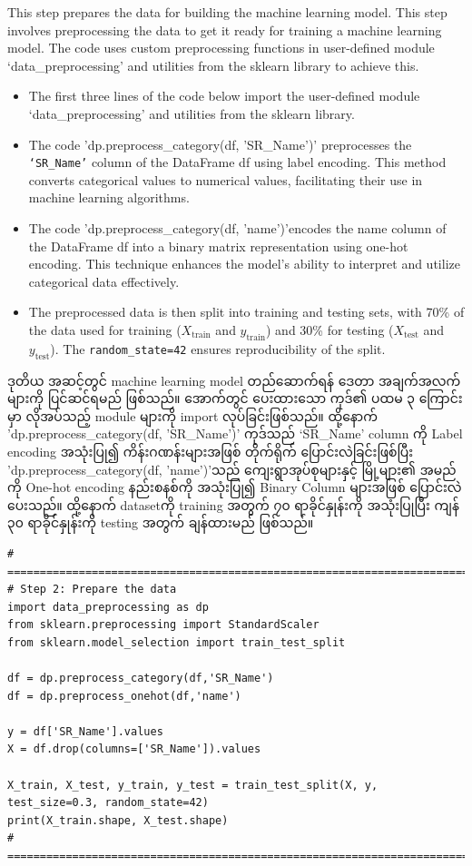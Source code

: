 \begin{step}
This step prepares the data for building the machine learning model. This step involves preprocessing the data to get it ready for training a machine learning model. The code uses custom preprocessing functions in user-defined module `data\_preprocessing' and utilities from the sklearn library to achieve this.
\begin{itemize}
  \item The first three lines of the code below import the user-defined module `data\_preprocessing' and utilities from the sklearn library. 
  
  \item The code 'dp.preprocess\_category(df, 'SR\_Name')' preprocesses the \texttt{`SR\_Name'} column of the DataFrame df using label encoding. This method converts categorical values to numerical values, facilitating their use in machine learning algorithms.
  
  \item The code 'dp.preprocess\_category(df, 'name')'encodes the name column of the DataFrame df into a binary matrix representation using one-hot encoding. This technique enhances the model's ability to interpret and utilize categorical data effectively. 
      
  \item The preprocessed data is then split into training and testing sets, with 70\% of the data used for training (\(X_{\text{train}}\) and \(y_{\text{train}}\)) and 30\% for testing (\(X_{\text{test}}\) and \(y_{\text{test}}\)). The \texttt{random\_state=42} ensures reproducibility of the split.
\end{itemize}

ဒုတိယ အဆင့်တွင် machine learning model တည်ဆောက်ရန် ဒေတာ အချက်အလက်များကို ပြင်ဆင်ရမည် ဖြစ်သည်။ အောက်တွင် ပေးထားသော ကုဒ်၏ ပထမ ၃ ကြောင်းမှာ လိုအပ်သည့် module များကို import လုပ်ခြင်းဖြစ်သည်။ ထို့နောက် 'dp.preprocess\_category(df, 'SR\_Name')' ကုဒ်သည် `SR\_Name' column ကို Label encoding အသုံးပြု၍ ကိန်းဂဏန်းများအဖြစ် တိုက်ရိုက် ပြောင်းလဲခြင်းဖြစ်ပြီး 'dp.preprocess\_category(df, 'name')'သည်  ကျေးရွာအုပ်စုများနှင့် မြို့များ၏ အမည်ကို One-hot encoding နည်းစနစ်ကို အသုံးပြု၍ Binary Column များအဖြစ် ပြောင်းလဲပေးသည်။  ထို့နောက် datasetကို training အတွက် ၇၀ ရာခိုင်နှုန်းကို အသုံးပြုပြီး ကျန် ၃၀ ရာခိုင်နှုန်းကို testing အတွက် ချန်ထားမည် ဖြစ်သည်။ 
\end{step}
\begin{lstlisting}
# =========================================================================#
# Step 2: Prepare the data
import data_preprocessing as dp
from sklearn.preprocessing import StandardScaler
from sklearn.model_selection import train_test_split

df = dp.preprocess_category(df,'SR_Name')
df = dp.preprocess_onehot(df,'name')

y = df['SR_Name'].values 
X = df.drop(columns=['SR_Name']).values

X_train, X_test, y_train, y_test = train_test_split(X, y, test_size=0.3, random_state=42)
print(X_train.shape, X_test.shape)
# =========================================================================#
\end{lstlisting}
